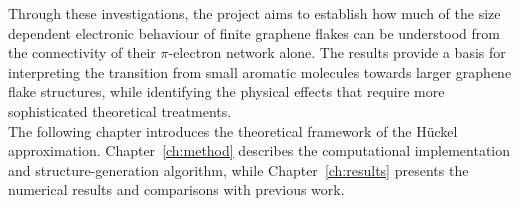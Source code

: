 \noindent Through these investigations, the project aims to establish how much of the size dependent electronic behaviour of finite graphene flakes can be understood from the connectivity of their $\pi$-electron network alone. The results provide a basis for interpreting the transition from small aromatic molecules towards larger graphene flake structures, while identifying the physical effects that require more sophisticated theoretical treatments. \\

\noindent The following chapter introduces the theoretical framework of the H\"uckel approximation. Chapter~\ref{ch:method} describes the computational implementation and structure-generation algorithm, while Chapter~\ref{ch:results} presents the numerical results and comparisons with previous work.
